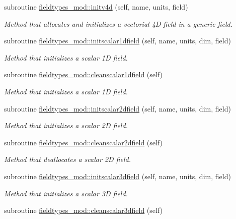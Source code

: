 \begin{DoxyCompactItemize}
subroutine \mbox{\hyperlink{namespacefieldtypes__mod_a08d665678bea0956a323d08863e164e5}{fieldtypes\+\_\+mod\+::initv4d}} (self, name, units, field)
\begin{DoxyCompactList}\small\item\em Method that allocates and initializes a vectorial 4D field in a generic field. \end{DoxyCompactList}\item 
subroutine \mbox{\hyperlink{namespacefieldtypes__mod_a96ff5318da6a7db8bb61c525315c1c89}{fieldtypes\+\_\+mod\+::initscalar1dfield}} (self, name, units, dim, field)
\begin{DoxyCompactList}\small\item\em Method that initializes a scalar 1D field. \end{DoxyCompactList}\item 
subroutine \mbox{\hyperlink{namespacefieldtypes__mod_aeb05bd1de9be296711016ad5b607a091}{fieldtypes\+\_\+mod\+::cleanscalar1dfield}} (self)
\begin{DoxyCompactList}\small\item\em Method that initializes a scalar 1D field. \end{DoxyCompactList}\item 
subroutine \mbox{\hyperlink{namespacefieldtypes__mod_a1a3160727c99017639d758aad9031df5}{fieldtypes\+\_\+mod\+::initscalar2dfield}} (self, name, units, dim, field)
\begin{DoxyCompactList}\small\item\em Method that initializes a scalar 2D field. \end{DoxyCompactList}\item 
subroutine \mbox{\hyperlink{namespacefieldtypes__mod_a26a4170db6067cf4ba85099f9701ff4c}{fieldtypes\+\_\+mod\+::cleanscalar2dfield}} (self)
\begin{DoxyCompactList}\small\item\em Method that deallocates a scalar 2D field. \end{DoxyCompactList}\item 
subroutine \mbox{\hyperlink{namespacefieldtypes__mod_a3f2b90bc391ea5b84ead8069ee90f515}{fieldtypes\+\_\+mod\+::initscalar3dfield}} (self, name, units, dim, field)
\begin{DoxyCompactList}\small\item\em Method that initializes a scalar 3D field. \end{DoxyCompactList}\item 
subroutine \mbox{\hyperlink{namespacefieldtypes__mod_a9f3716bcbd2524ed608c86920cab8693}{fieldtypes\+\_\+mod\+::cleanscalar3dfield}} (self)

\end{DoxyCompactItemize}
